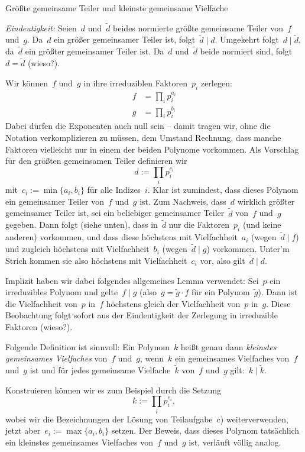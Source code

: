 \documentclass{algblatt}
\begin{document}
\begin{aufgabe}{Größte gemeinsame Teiler und kleinste gemeinsame Vielfache}
\begin{loesungE}
\emph{Eindeutigkeit:} Seien~$d$ und~$\widetilde d$ beides normierte
größte gemeinsame Teiler von~$f$ und~$g$. Da~$d$ ein größer gemeinsamer Teiler
ist, folgt~$\widetilde d \mid d$. Umgekehrt folgt~$d \mid \widetilde d$,
da~$\widetilde d$ ein größter gemeinsamer Teiler ist. Da~$d$ und~$\widetilde d$
beide normiert sind, folgt~$d = \widetilde d$ (wieso?).

\item Wir können~$f$ und~$g$ in ihre irreduziblen Faktoren~$p_i$ zerlegen:
\begin{align*}
  f &= \prod_i p_i^{a_i} \\
  g &= \prod_i p_i^{b_i}
\end{align*}
Dabei dürfen die Exponenten auch null sein -- damit tragen wir, ohne die
Notation verkomplizieren zu müssen, dem Umstand Rechnung, dass manche Faktoren
vielleicht nur in einem der beiden Polynome vorkommen. Als Vorschlag für den
größten gemeinsamen Teiler definieren wir
\[ d := \prod_i p_i^{c_i} \]
mit~$c_i := \min\{ a_i, b_i \}$ für alle Indizes~$i$. Klar ist zumindest, dass
dieses Polynom ein gemeinsamer Teiler von~$f$ und~$g$ ist. Zum Nachweis,
dass~$d$ wirklich größter gemeinsamer Teiler ist, sei ein beliebiger
gemeinsamer Teiler~$\widetilde d$ von~$f$ und~$g$ gegeben. Dann folgt (siehe
unten), dass in~$\widetilde d$ nur die Faktoren~$p_i$ (und keine anderen)
vorkommen, und dass diese höchstens mit Vielfachheit~$a_i$ (wegen~$\widetilde d
\mid f$) und zugleich höchstens mit Vielfachheit~$b_i$ (wegen~$\widetilde d
\mid g$) vorkommen. Unter'm Strich kommen sie also höchstens mit
Vielfachheit~$c_i$ vor, also gilt~$\widetilde d \mid d$.

Implizit haben wir dabei folgendes allgemeines Lemma verwendet: Sei~$p$ ein irreduzibles
Polynom und gelte~$f \mid g$ (also~$g = \widetilde g \cdot f$ für ein
Polynom~$\widetilde g$). Dann ist die Vielfachheit von~$p$ in~$f$
höchstens gleich der Vielfachheit von~$p$ in~$g$. Diese Beobachtung folgt
sofort aus der Eindeutigkeit der Zerlegung in irreduzible Faktoren (wieso?).

\item Folgende Definition ist sinnvoll: Ein Polynom~$k$ heißt genau dann
\emph{kleinstes gemeinsames Vielfaches} von~$f$ und~$g$, wenn~$k$ ein
gemeinsames Vielfaches von~$f$ und~$g$ ist und für jedes gemeinsame
Vielfache~$\widetilde k$ von~$f$ und~$g$ gilt:~$k \mid \widetilde k$.

Konstruieren können wir es zum Beispiel durch die Setzung
\[ k := \prod_i p_i^{e_i}, \]
wobei wir die Bezeichnungen der Lösung von Teilaufgabe~c) weiterverwenden,
jetzt aber~$e_i := \max\{ a_i, b_i \}$ setzen. Der Beweis, dass dieses Polynom
tatsächlich ein kleinstes gemeinsames Vielfaches von~$f$ und~$g$ ist, verläuft
völlig analog.


\end{loesungE}
\end{aufgabe}
\end{document}
